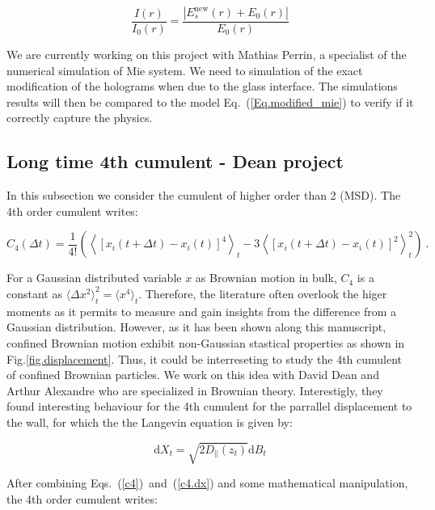 \begin{equation}
	\frac{I(r)}{I_0(r)} = \frac{|E_s^\mathrm{new}(r) + E_0(r)|}{E_0(r)}
	\label{Eq.modified_mie}
\end{equation}

We are currently working on this project with Mathias Perrin, a specialist of the numerical simulation of Mie system. We need to simulation of the exact modification of the holograms when due to the glass interface. The simulations results will then be compared to the model Eq.~(\ref{Eq.modified_mie}) to verify if it correctly capture the physics. 


\subsection{Long time 4th cumulent - Dean project}

In this subsection we consider the cumulent of higher order than 2 (\gls{MSD}). The 4th order cumulent writes:

\begin{equation}
	C_4 (\Delta t) = \frac{1}{4!} \left(
		\left\langle [ x_i(t + \Delta t) - x_i(t) ]^4 \right\rangle_t
		- 3\left\langle [ x_i(t + \Delta t) - x_i(t) ]^2 \right\rangle_t ^2
	   \right) ~.
	   \label{c4}
\end{equation}

For a Gaussian distributed variable $x$ as Brownian motion in bulk, $C_4$ is a constant as $\langle \Delta x ^2 \rangle _t ^2 = \langle x^4 \rangle_t $. Therefore, the literature often overlook the higer moments as it permits to measure and gain insights from the difference from a Gaussian distribution. However, as it has been shown along this manuscript, confined Brownian motion exhibit non-Gaussian stastical properties as shown in Fig.\ref{fig.displacement}. Thus, it could be interreseting to study the 4th cumulent of confined Brownian particles. We work on this idea with David Dean and Arthur Alexandre who are specialized in Brownian theory. Interestigly, they found interesting behaviour for the 4th cumulent for the parrallel displacement to the wall, for which the the Langevin equation is given by:

\begin{equation}
	\mathrm{d}X_t = \sqrt{2D_\parallel(z_t)} \mathrm{d}B_t
	\label{c4.dx}
\end{equation}

After combining Eqs.~(\ref{c4})~and~(\ref{c4.dx}) and some mathematical manipulation, the 4th order cumulent writes:


